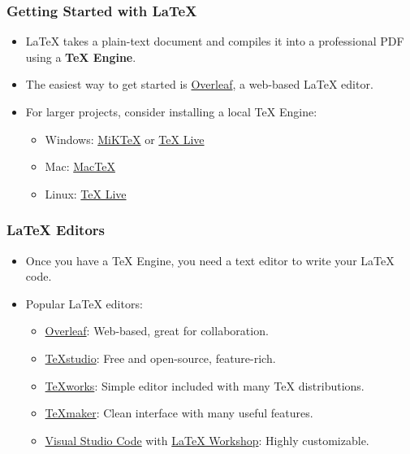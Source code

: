 \documentclass{beamer}
\begin{document}
    \begin{frame}
        \frametitle{Getting Started with \LaTeX{}}

    \begin{itemize}
        \item \LaTeX{} takes a plain-text document and compiles it into a professional PDF using a \textbf{TeX Engine}.
        \item The easiest way to get started is \href{https://www.overleaf.com/}{Overleaf}, a web-based \LaTeX{} editor.
        \item For larger projects, consider installing a local TeX Engine:
        \begin{itemize}
            \item Windows: \href{https://miktex.org/}{MiKTeX} or \href{https://www.tug.org/texlive/}{TeX Live}
            \item Mac: \href{https://www.tug.org/mactex/}{MacTeX}
            \item Linux: \href{https://www.tug.org/texlive/}{TeX Live}
        \end{itemize}
    \end{itemize}
    \end{frame}
    
    \begin{frame}
        \frametitle{\LaTeX{} Editors}

    \begin{itemize}
        \item Once you have a TeX Engine, you need a text editor to write your \LaTeX{} code.
        \item Popular \LaTeX{} editors:
        \begin{itemize}
            \item \href{https://www.overleaf.com/}{Overleaf}: Web-based, great for collaboration.
            \item \href{https://www.texstudio.org/}{TeXstudio}: Free and open-source, feature-rich.
            \item \href{https://www.tug.org/texworks/}{TeXworks}: Simple editor included with many TeX distributions.
            \item \href{https://www.xm1math.net/texmaker/}{TeXmaker}: Clean interface with many useful features.
            \item \href{https://code.visualstudio.com/}{Visual Studio Code} with \href{https://marketplace.visualstudio.com/items?itemName=James-Yu.latex-workshop}{LaTeX Workshop}: Highly customizable.
        \end{itemize}
    \end{itemize}
    \end{frame}
    
\end{document}
